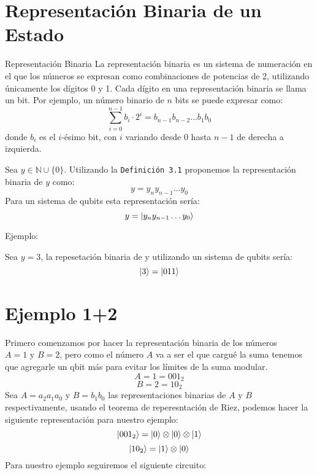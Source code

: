 \documentclass{article}
\begin{document}
\section{Representación Binaria de un Estado}
\begin{mydef}{Representación Binaria}{}
La representación binaria es un sistema de numeración en el que los números se expresan como combinaciones de potencias de 2, utilizando únicamente los dígitos 0 y 1. Cada dígito en una representación binaria se llama un bit. Por ejemplo, un número binario de \( n \) bits se puede expresar como:
\[
 \sum_{i=0}^{n-1} b_i \cdot 2^i = b_{n-1}b_{n-2}\ldots b_1b_0 
\]
donde \( b_i \) es el \( i \)-ésimo bit, con \( i \) variando desde 0 hasta \( n-1 \) de derecha a izquierda.
\end{mydef}
Sea \(y\in \mathbb{N}\cup\{0\}\). Utilizando la \texttt{Definición 3.1} proponemos la representación binaria
de \(y\) como: 
\[y= y_{n}y_{n-1}\ldots y_{0}\]
Para un sistema de qubits esta representación sería:
\[y= \ket{y_{n}y_{n-1}\ldots y_{0}}\]
\begin{mdframed}[backgroundcolor=blue!10, linewidth=1pt, linecolor=blue]
    Ejemplo:

    Sea \(y= 3\), la repesetación binaria de y utilizando un sistema de qubits sería:
    \[\ket{3} = \ket{011}\]
\end{mdframed}



\section{Ejemplo 1+2}
Primero comenzamos por hacer la representación binaria de los números
\(A = 1 \text{ y } B=2 \), pero como el número \(A\) va a ser el que cargué la suma
tenemos que agregarle un qbit más para evitar los límites de la suma modular.
\[A = 1 = 001_2\]
\[B=2=10_2\]
Sea \(A=a_{2}a_{1}a_{0}\) y \(B=b_1b_0\) las representaciones binarias de \(A \text{ y } B\)
respectivamente, usando el teorema de reperesntación de Riez, podemos hacer la siguiente representación
para nuestro ejemplo:
\[\ket{001_2}= \ket{0}\otimes\ket{0}\otimes\ket{1}\]
 \[\ket{10_2}=\ket{1}\otimes\ket{0}\]
Para nuestro ejemplo seguiremos el siguiente circuito:
\end{document}

